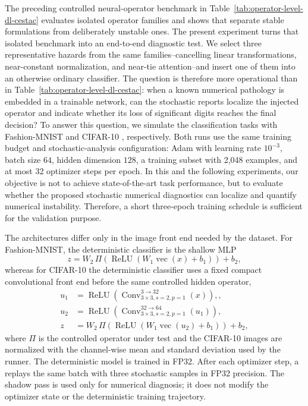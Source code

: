 \documentclass[manuscript, screen]{acmart}
\newcommand{\xyy}[1]{{\color{black}{#1}}}
\begin{document}
The preceding controlled neural-operator benchmark in
Table~\ref{tab:operator-level-dl-cestac} evaluates isolated operator families and shows that \xyy{the CESTAC-style arithmetic-level reports} separate stable formulations from deliberately unstable ones. The present experiment turns
that isolated benchmark into an end-to-end diagnostic test. We select three representative hazards from the same families{--}cancelling linear transformations, near-constant normalization, and near-tie attention{--}and insert one of them into an otherwise ordinary classifier. The question is
therefore more operational than in Table~\ref{tab:operator-level-dl-cestac}:
when a known numerical pathology is embedded in a trainable network, can the
stochastic reports localize the injected operator and indicate whether its
loss of significant digits reaches the final decision? To answer this question, we simulate the classification tasks
with Fashion-MNIST \citep{xiao2017fashionmnist} and CIFAR-10 \citep{krizhevsky2009learning}, respectively. Both runs use the
same training budget and stochastic-analysis configuration: Adam with learning rate $10^{-3}$, batch size $64$, hidden dimension $128$, a
training subset with 2,048 examples,  and at most 32 optimizer steps per epoch. In this and the following experiments, our objective is not to achieve state-of-the-art task performance, but to evaluate whether the proposed stochastic numerical diagnostics can localize and quantify numerical instability. Therefore, a short three-epoch training schedule is sufficient for the validation purpose.
 
The architectures differ only in the image front end needed by the dataset. For
Fashion-MNIST, the deterministic classifier is the shallow MLP
\begin{equation}
z
=
W_2\,
\Pi\!\left(
\operatorname{ReLU}(W_1\operatorname{vec}(x)+b_1)
\right)+b_2,
\label{eq:pathology-mlp}
\end{equation}
whereas for CIFAR-10 the deterministic classifier uses a fixed compact
convolutional front end before the same controlled hidden operator,
\begin{align}
u_1 &= \operatorname{ReLU}(\operatorname{Conv}_{3\times 3,s=2,p=1}^{3\rightarrow 32}(x)),\nonumber, \\
u_2 &= \operatorname{ReLU}(\operatorname{Conv}_{3\times 3,s=2,p=1}^{32\rightarrow 64}(u_1)),\nonumber\\
z
&=
W_2\,
\Pi\!\left(
\operatorname{ReLU}(W_1\operatorname{vec}(u_2)+b_1)
\right)+b_2 ,
\label{eq:pathology-cnn}
\end{align}
where $\Pi$ is the controlled operator under test and the CIFAR-10 images
are normalized with the channel-wise mean and standard deviation used by the
runner. The deterministic model is trained in FP32. After
each optimizer step, a \xyy{synchronized CESTAC-style arithmetic-level shadow model} replays the same batch with three stochastic samples in FP32 precision. The shadow pass is used only for numerical diagnosis; it does not
modify the optimizer state or the deterministic training trajectory.
\end{document}
